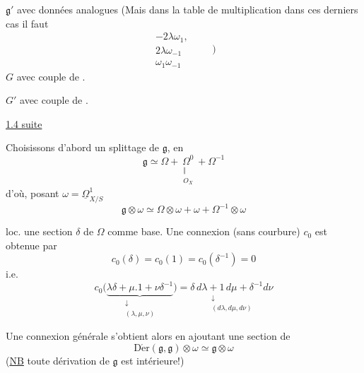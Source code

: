 \diagram{\begin{tikzcd}[row sep=small] {}\arrow[d,leftrightarrow]\\{}\end{tikzcd}}
$\mathfrak g'$ avec données analogues
(Mais dans la table de multiplication
dans ces derniers cas il faut
\[
\begin{array}{r}
-2\lambda\omega_1,\\
2\lambda\omega_{-1}\\
\omega_1\omega_{-1}
\end{array}
\qquad)
\]
\diagram{\begin{tikzcd}[row sep=small] {}\arrow[d,leftrightarrow]\\{}\end{tikzcd}}
$G$ avec couple de .

\diagram{\begin{tikzcd}[row sep=small] {}\arrow[d,leftrightarrow]\\{}\end{tikzcd}}
$G'$ avec couple de .

\uline{1.4 suite}

Choisissons d'abord un splittage de 
$\mathfrak g$, en
\[
\mathfrak g\simeq\Omega+\underset{\substack{\Vert\\O_X}}{\Omega^0}+\Omega^{-1}
\]
d'où, posant $\omega=\underline\Omega^1_{X/S}$
\[
\mathfrak g\otimes\omega\simeq\Omega\otimes\omega+\omega+\Omega^{-1}\otimes\omega
\]
\par {} loc. une section $\delta$ de $\Omega$ comme
base. Une connexion (sans courbure)
$c_0$ est obtenue par
\[
c_0(\delta)=c_0(1)=c_0(\delta^{-1})=0
\]
i.e.
\[
c_0\bigl(\underset{\substack{\downarrow\\(\lambda,\mu,\nu)}}{\underbrace{\lambda\delta+\mu.1+\nu\delta^{-1}}}\bigr)
=\underset{\substack{\downarrow\\(d\lambda,d\mu,d\nu)}}{\delta\,d\lambda+1\,d\mu+\delta^{-1}d\nu}
\]

Une connexion générale s'obtient alors en
ajoutant une section de
\[
\operatorname{D\acute er}(\mathfrak g,\mathfrak g)\otimes\omega\simeq\mathfrak g\otimes\omega
\]
(\uline{NB} toute dérivation de $\mathfrak g$ est intérieure!)

